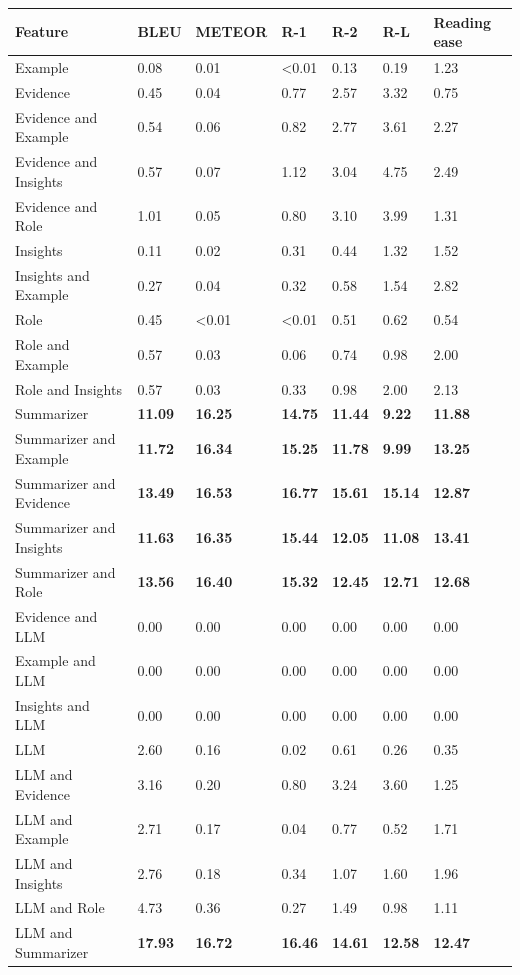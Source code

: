 \begin{tabular}{|l|l|l|l|l|l|l|}
\hline
\textbf{Feature} & BLEU & METEOR & R-1 & R-2 & R-L & Reading ease \\
 \hline
 Example & 0.08 & 0.01 & \textless{}0.01 & 0.13 & 0.19 & 1.23 \\
 \hline
 Evidence & 0.45 & 0.04 & 0.77 & 2.57 & 3.32 & 0.75 \\
 \hline
 Evidence and Example & 0.54 & 0.06 & 0.82 & 2.77 & 3.61 & 2.27 \\
 \hline
 Evidence and Insights & 0.57 & 0.07 & 1.12 & 3.04 & 4.75 & 2.49 \\
 \hline
 Evidence and Role & 1.01 & 0.05 & 0.80 & 3.10 & 3.99 & 1.31 \\
 \hline
 Insights & 0.11 & 0.02 & 0.31 & 0.44 & 1.32 & 1.52 \\
 \hline
 Insights and Example & 0.27 & 0.04 & 0.32 & 0.58 & 1.54 & 2.82 \\
 \hline
 Role & 0.45 & \textless{}0.01 & \textless{}0.01 & 0.51 & 0.62 & 0.54 \\
 \hline
 Role and Example & 0.57 & 0.03 & 0.06 & 0.74 & 0.98 & 2.00 \\
 \hline
 Role and Insights & 0.57 & 0.03 & 0.33 & 0.98 & 2.00 & 2.13 \\
 \hline
 Summarizer & \textbf{11.09} & \textbf{16.25} & \textbf{14.75} & \textbf{11.44} & \textbf{9.22} & \textbf{11.88} \\
 \hline
 Summarizer and Example & \textbf{11.72} & \textbf{16.34} & \textbf{15.25} & \textbf{11.78} & \textbf{9.99} & \textbf{13.25} \\
 \hline
 Summarizer and Evidence & \textbf{13.49} & \textbf{16.53} & \textbf{16.77} & \textbf{15.61} & \textbf{15.14} & \textbf{12.87} \\
 \hline
 Summarizer and Insights & \textbf{11.63} & \textbf{16.35} & \textbf{15.44} & \textbf{12.05} & \textbf{11.08} & \textbf{13.41} \\
 \hline
 Summarizer and Role & \textbf{13.56} & \textbf{16.40} & \textbf{15.32} & \textbf{12.45} & \textbf{12.71} & \textbf{12.68} \\
 \hline
 Evidence and LLM & 0.00 & 0.00 & 0.00 & 0.00 & 0.00 & 0.00 \\
 \hline
 Example and LLM & 0.00 & 0.00 & 0.00 & 0.00 & 0.00 & 0.00 \\
 \hline
 Insights and LLM & 0.00 & 0.00 & 0.00 & 0.00 & 0.00 & 0.00 \\
 \hline
 LLM & 2.60 & 0.16 & 0.02 & 0.61 & 0.26 & 0.35 \\
 \hline
 LLM and Evidence & 3.16 & 0.20 & 0.80 & 3.24 & 3.60 & 1.25 \\
 \hline
 LLM and Example & 2.71 & 0.17 & 0.04 & 0.77 & 0.52 & 1.71 \\
 \hline
 LLM and Insights & 2.76 & 0.18 & 0.34 & 1.07 & 1.60 & 1.96 \\
 \hline
 LLM and Role & 4.73 & 0.36 & 0.27 & 1.49 & 0.98 & 1.11 \\
 \hline
 LLM and Summarizer & \textbf{17.93} & \textbf{16.72} & \textbf{16.46} & \textbf{14.61} & \textbf{12.58} & \textbf{12.47} \\
\hline
\end{tabular}
